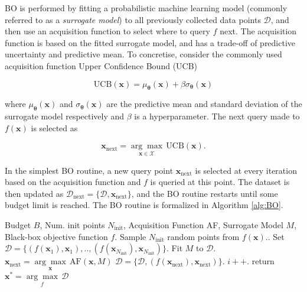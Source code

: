 \noindent BO is performed by fitting a probabilistic machine learning model (commonly referred to as a \textit{surrogate model}) to all previously collected data points $\mathcal{D}$, and then use an acquisition function to select where to query $f$ next. The acquisition function is based on the fitted surrogate model, and has a trade-off of predictive uncertainty and predictive mean. To concretise, consider the commonly used acquisition function Upper Confidence Bound (UCB) \citep{Srinivas_2012}

\begin{equation}
    \text{UCB}(\mathbf{x}) = \mu_{\bm{\theta}}(\mathbf{x})+\beta\sigma_{\bm{\theta}}(\mathbf{x})
\end{equation}

\noindent where $\mu_{\bm{\theta}}(\mathbf{x})$ and $\sigma_{\bm{\theta}}(\mathbf{x})$ are the predictive mean and standard deviation of the surrogate model respectively and $\beta$ is a hyperparameter. The next query made to $f(\mathbf{x})$ is selected as

\begin{equation}
        \mathbf{x}_\text{next} = \underset{\mathbf{x}\in \mathcal{X}}{\arg\max}\,\text{UCB}(\mathbf{x}).
\end{equation}

\noindent In the simplest BO routine, a new query point $\mathbf{x}_\text{next}$ is selected at every iteration based on the acquisition function and $f$ is queried at this point. The dataset is then updated as $\mathcal{D}_{\text{next}}=\{\mathcal{D}, \mathbf{x}_\text{next}\}$, and the BO routine restarts until some budget limit is reached. The BO routine is formalized in Algorithm \ref{alg:BO}. \\

\begin{algorithm}[H]
\centering
\caption{Bayesian Optimisation}
\begin{algorithmic}
\STATE Budget $B$, Num. init points $N_{\text{init}}$, Acquisition Function AF, Surrogate Model $M$, Black-box objective function $f$.
\STATE Sample $N_{\text{init}}$ random points from $f(\mathbf{x})$..
\STATE Set $\mathcal{D}=\{(f(\mathbf{x}_1), \mathbf{x}_1),..,(f(\mathbf{x}_{N_{\text{init}}}), \mathbf{x}_{N_{\text{init}}})\}$.
\STATE Fit $M$ to $\mathcal{D}$.
\STATE $\mathbf{x}_\text{next} = \underset{\mathbf{x}}{\arg\max}\, \text{AF}(\mathbf{x}, M)$
\STATE $\mathcal{D} = \{\mathcal{D}, (f(\mathbf{x}_\text{next}), \mathbf{x}_\text{next})\}$.
\STATE $i++$.
\ENDWHILE
\STATE return $\mathbf{x}^*= \underset{f}{\arg\max}\,\mathcal{D}$
\end{algorithmic}
\label{alg:BO}
\end{algorithm}

